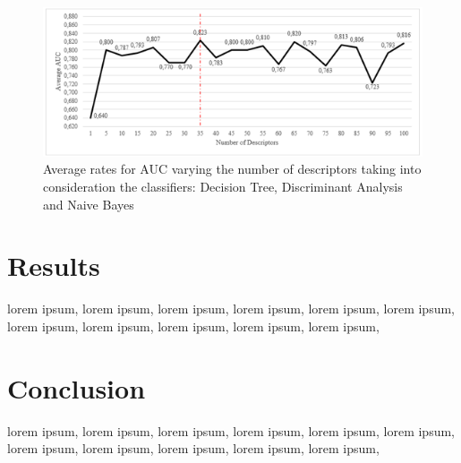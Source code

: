 \documentclass[conference]{IEEEtran}
\begin{document}
\begin{figure}[h]
    \centering
    \includegraphics[width=18.3cm]{images/chart.png}
    \caption{Average rates for AUC varying the number of descriptors taking into consideration the classifiers: Decision Tree, Discriminant Analysis and Naive Bayes}
    \label{fig:my_label}
\end{figure}{}

\section{Results}
lorem ipsum, lorem ipsum, lorem ipsum, lorem ipsum, lorem ipsum, lorem ipsum, lorem ipsum, lorem ipsum, lorem ipsum, lorem ipsum, lorem ipsum, 

\section{Conclusion}
lorem ipsum, lorem ipsum, lorem ipsum, lorem ipsum, lorem ipsum, lorem ipsum, lorem ipsum, lorem ipsum, lorem ipsum, lorem ipsum, lorem ipsum, 



\end{document}
